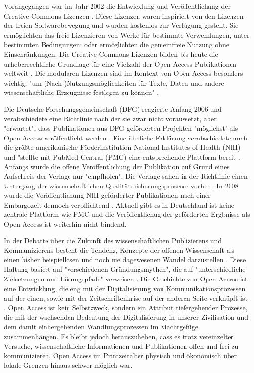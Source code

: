 Vorangegangen war im Jahr 2002 die Entwicklung und Veröffentlichung der Creative Commons Lizenzen \cite{suchen-Hoffmann-Zugang-undVerwertung-oeffentlicher-Informationen}. Diese Lizenzen waren inspiriert von den Lizenzen der freien Softwarebewegung und wurden kostenlos zur Verfügung gestellt. Sie ermöglichten das freie Lizenzieren von Werke für bestimmte Verwendungen, unter bestimmten Bedingungen; oder ermöglichten die gemeinfreie Nutzung ohne Einschränkungen. Die Creative Commons Lizenzen bilden bis heute die urheberrechtliche Grundlage für eine Vielzahl der Open Access Publikationen weltweit \cite{suchen}. Die modularen Lizenzen sind im Kontext von Open Access besonders wichtig, "um (Nach-)Nutzungsmöglichkeiten für Texte, Daten und andere wissenschaftliche Erzeugnisse festlegen zu können" \cite{suchen-Hoffmann-Zugang-undVerwertung-oeffentlicher-Informationen}.

Die Deutsche Forschungsgemeinschaft (DFG) reagierte Anfang 2006 und verabschiedete eine Richtlinie nach der sie zwar nicht voraussetzt, aber "erwartet", dass Publikationen aus DFG-geförderten Projekten "möglichst" als Open Access veröffentlicht werden \cite{suchen:dfg-richtlinie}. Eine ähnliche Erklärung verabschiedete auch die größte amerikanische Förderinstitution National Institutes of Health (NIH) und "stellte mit PubMed Central (PMC) eine entsprechende Plattform bereit \cite{muller_2010_open}. Anfangs wurde die offene Veröffentlichung der Publikation auf Grund eines Aufschreis der Verlage nur "empfholen". Die Verlage sahen in der Richtlinie einen Untergang der wissenschaftlichen Qualitätssicherungsprozesse vorher \cite{Baggs_2006}. In 2008 wurde die Veröffentlichung NIH-geförderter Publikationen nach einer Embargozeit dennoch verpflichtend \cite{Hanekop_2014}. Aktuell gibt es in Deutschland ist keine zentrale Plattform wie PMC und die Veröffentlichug der geförderten Ergbnisse als Open Access ist weiterhin nicht bindend.

In der Debatte über die Zukunft des wissenschaftlichen Publizierens und Kommunizierens besteht die Tendenz, Konzepte der offenen Wissenschaft als einen bisher beispiellosen und noch nie dagewesenen Wandel darzustellen \cite{cite:17a} \cite{cite:17b}. Diese Haltung basiert auf "verschiedenen Gründungsmythen", die auf "unterschiedliche Zielsetzungen und Lösungspfade" verweisen \cite{suchen-Hoffmann-Zugang-undVerwertung-oeffentlicher-Informationen}. Die Geschichte von Open Access ist eine Entwicklung, die eng mit der Digitalisierung von Kommunikationsprozessen \cite{albert_2006_open_implications} auf der einen, sowie mit der Zeitschriftenkrise auf der anderen Seite verknüpft ist \cite{suchen-Hoffmann-Zugang-undVerwertung-oeffentlicher-Informationen}. Open Access ist kein Selbstzweck\cite{cite:17d}, sondern ein Attribut tiefergehender Prozesse, die mit der wachsenden Bedeutung der Digitalisierung in unserer Zivilisation und dem damit einhergehenden Wandlungsprozessen im Machtgefüge zusammenhängen\cite{cite:17e}. Es bleibt jedoch herauszuheben, dass es trotz vereinzelter Versuche, wissenschaftliche Informationen und Publikationen offen und frei zu kommunizieren, Open Access im Printzeitalter physisch und ökonomisch über lokale Grenzen hinaus schwer möglich war\cite{cite:18a}.

